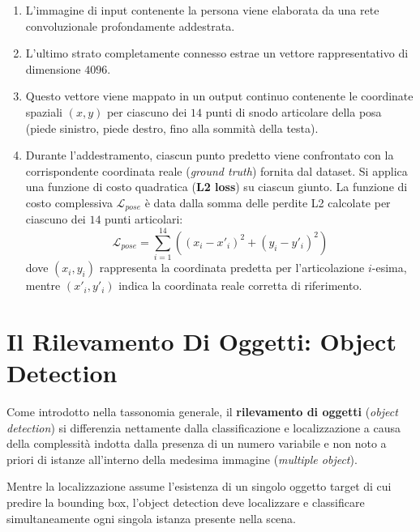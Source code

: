 ﻿\documentclass[11pt, a4paper]{article}
\begin{document}
\begin{enumerate}[noitemsep]
    \item L'immagine di input contenente la persona viene elaborata da una rete convoluzionale profondamente addestrata.
    \item L'ultimo strato completamente connesso estrae un vettore rappresentativo di dimensione $4096$.
    \item Questo vettore viene mappato in un output continuo contenente le coordinate spaziali $(x, y)$ per ciascuno dei $14$ punti di snodo articolare della posa (piede sinistro, piede destro, fino alla sommità della testa).
    \item Durante l'addestramento, ciascun punto predetto viene confrontato con la corrispondente coordinata reale (\emph{ground truth}) fornita dal dataset. Si applica una funzione di costo quadratica (\textbf{L2 loss}) su ciascun giunto. La funzione di costo complessiva $\mathcal{L}_{pose}$ è data dalla somma delle perdite L2 calcolate per ciascuno dei $14$ punti articolari:
    \[
    \boxed{\mathcal{L}_{pose} = \sum_{i=1}^{14} \left( (x_i - x'_i)^2 + (y_i - y'_i)^2 \right)}
    \]
    dove $(x_i, y_i)$ rappresenta la coordinata predetta per l'articolazione $i$-esima, mentre $(x'_i, y'_i)$ indica la coordinata reale corretta di riferimento.
\end{enumerate}

\newpage

\section{Il Rilevamento Di Oggetti: Object Detection}

Come introdotto nella tassonomia generale, il \textbf{rilevamento di oggetti} (\emph{object detection}) si differenzia nettamente dalla classificazione e localizzazione a causa della complessità indotta dalla presenza di un numero variabile e non noto a priori di istanze all'interno della medesima immagine (\emph{multiple object}).


Mentre la localizzazione assume l'esistenza di un singolo oggetto target di cui predire la bounding box, l'object detection deve localizzare e classificare simultaneamente ogni singola istanza presente nella scena.
\end{document}
